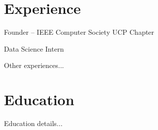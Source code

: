 \documentclass{article}
\begin{document}
\section*{Experience}
Founder -- IEEE Computer Society UCP Chapter
\par
Data Science Intern
\par
Other experiences...
\section*{Education}
Education details...
\end{document}
